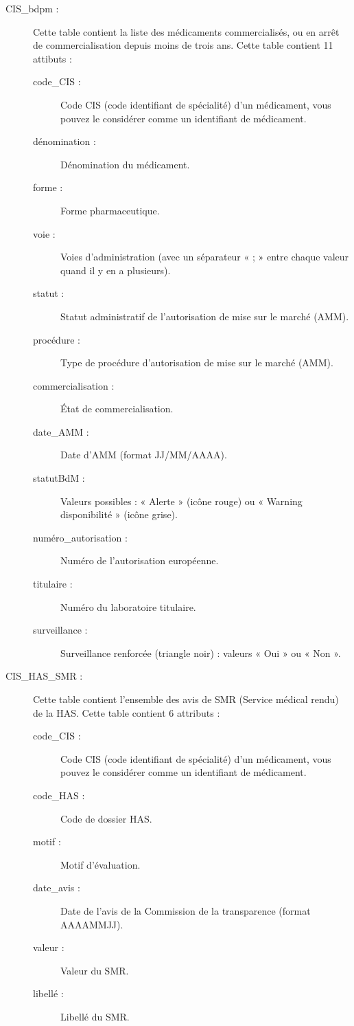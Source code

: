 \begin{description}
  \item[CIS\_bdpm :] Cette table contient la liste des médicaments commercialisés, ou en arrêt de commercialisation depuis moins de trois ans. Cette table contient 11 attibuts : 
    \begin{description}
      \item[code\_CIS :] Code CIS (code identifiant de spécialité) d'un médicament, vous pouvez le considérer comme un identifiant de médicament. 
      \item[dénomination :] Dénomination du médicament. 
      \item[forme :] Forme pharmaceutique.
      \item[voie :] Voies d'administration (avec un séparateur « ; » entre chaque valeur quand il y en a plusieurs). 
      \item[statut :]  Statut administratif de l’autorisation de mise sur le marché (AMM).
      \item[procédure :] Type de procédure d'autorisation de mise sur le marché (AMM).
      \item[commercialisation :] État de commercialisation.
      \item[date\_AMM :] Date d’AMM (format JJ/MM/AAAA).
      \item[statutBdM :] Valeurs possibles : « Alerte » (icône rouge) ou « Warning disponibilité » (icône grise).
      \item[numéro\_autorisation :]  Numéro de l’autorisation européenne.
      \item[titulaire :] Numéro du laboratoire titulaire. 
      \item[surveillance :] Surveillance renforcée (triangle noir) : valeurs « Oui » ou « Non ».
    \end{description}
  \item[CIS\_HAS\_SMR :] Cette table contient l'ensemble des avis de SMR (Service médical rendu) de la HAS. Cette table contient 6 attributs : 
    \begin{description}
      \item[code\_CIS :] Code CIS (code identifiant de spécialité) d'un médicament, vous pouvez le considérer comme un identifiant de médicament. 
      \item[code\_HAS :] Code de dossier HAS. 
      \item[motif :] Motif d'évaluation.
      \item[date\_avis :] Date de l’avis de la Commission de la transparence (format AAAAMMJJ).
      \item[valeur :] Valeur du SMR. 
      \item[libellé :] Libellé du SMR. 
    \end{description}
\end{description}

